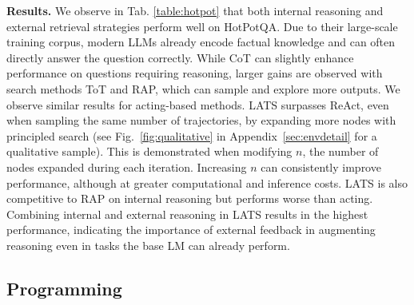 \documentclass{article} \usepackage{iclr2024_conference,times}
\begin{document}
 
\textbf{Results.} We observe in Tab. \ref{table:hotpot} that both internal reasoning and external retrieval strategies perform well on HotPotQA. Due to their large-scale training corpus, modern LLMs already encode factual knowledge and can often directly answer the question correctly. While CoT can slightly enhance performance on questions requiring reasoning, larger gains are observed with search methods ToT and RAP, which can sample and explore more outputs. We observe similar results for acting-based methods. LATS surpasses ReAct, even when sampling the same number of trajectories, by expanding more nodes with principled search (see Fig.~\ref{fig:qualitative} in Appendix~\ref{sec:envdetail} for a qualitative sample). This is demonstrated when modifying $n$, the number of nodes expanded during each iteration. Increasing $n$ can consistently improve performance, although at greater computational and inference costs. LATS is also competitive to RAP on internal reasoning but performs worse than acting. Combining internal and external reasoning in LATS results in the highest performance, indicating the importance of external feedback in augmenting reasoning even in tasks the base LM can already perform.

\subsection{Programming}
\end{document}
